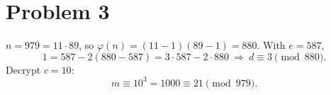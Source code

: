 \section*{Problem 3}

$n=979=11\cdot 89$, so $\varphi(n)=(11-1)(89-1)=880$. With $e=587$,
\[
1=587-2(880-587)=3\cdot 587-2\cdot 880 \ \Rightarrow\ d\equiv 3 \pmod{880}.
\]
Decrypt $c=10$:
\[
m\equiv 10^3=1000\equiv \boxed{21}\pmod{979}.
\]
